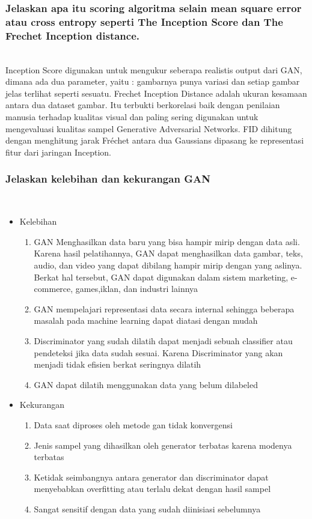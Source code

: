 \subsubsection{Jelaskan apa itu scoring algoritma selain mean square error atau cross entropy seperti The Inception Score dan The Frechet Inception distance.} 
\hfill\\
Inception Score digunakan untuk mengukur seberapa realistis output dari GAN, dimana ada dua parameter, yaitu : gambarnya punya variasi dan setiap gambar jelas terlihat seperti sesuatu. Frechet Inception Distance adalah ukuran kesamaan antara dua dataset gambar. Itu terbukti berkorelasi baik dengan penilaian manusia terhadap kualitas visual dan paling sering digunakan untuk mengevaluasi kualitas sampel Generative Adversarial Networks. FID dihitung dengan menghitung jarak Fréchet antara dua Gaussians dipasang ke representasi fitur dari jaringan Inception.

\subsubsection{Jelaskan kelebihan dan kekurangan GAN} 
\hfill\\
\begin{itemize}
 \item Kelebihan 
   \begin{enumerate}
      \item GAN Menghasilkan data baru yang bisa hampir mirip dengan data asli. Karena hasil pelatihannya, GAN dapat menghasilkan data gambar, teks, audio, dan video yang dapat dibilang hampir mirip dengan yang aslinya. Berkat hal tersebut, GAN dapat digunakan dalam sistem marketing, e-commerce, games,iklan, dan industri lainnya
      \item GAN mempelajari representasi data secara internal sehingga beberapa masalah pada machine learning dapat diatasi dengan mudah
      \item Discriminator yang sudah dilatih dapat menjadi sebuah classifier atau pendeteksi jika data sudah sesuai. Karena Discriminator yang akan menjadi tidak efisien berkat seringnya dilatih
      \item GAN dapat dilatih menggunakan data yang belum dilabeled
   \end{enumerate}
 \item Kekurangan
   \begin{enumerate}  
      \item Data saat diproses oleh metode gan tidak konvergensi
      \item Jenis sampel yang dihasilkan oleh generator terbatas karena modenya terbatas
      \item Ketidak seimbangnya antara generator dan discriminator dapat menyebabkan overfitting atau terlalu dekat dengan hasil sampel
      \item Sangat sensitif dengan data yang sudah diinisiasi sebelumnya
   \end{enumerate}
\end{itemize}

